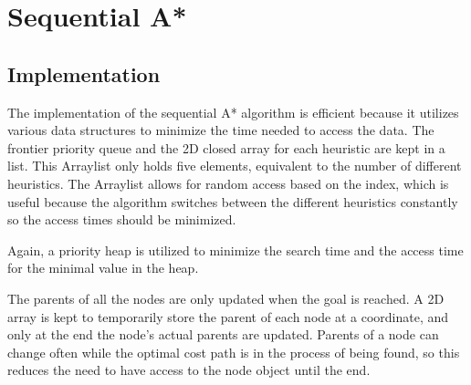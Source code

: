\section{Sequential A*}

\subsection{Implementation}

The implementation of the sequential A* algorithm is efficient because it utilizes various data structures to minimize the time needed to access the data. The frontier priority queue and the 2D closed array for each heuristic are kept in a list. This Arraylist only holds five elements, equivalent to the number of different heuristics. The Arraylist allows for random access based on the index, which is useful because the algorithm switches between the different heuristics constantly so the access times should be minimized.

Again, a priority heap is utilized to minimize the search time and the access time for the minimal value in the heap.

The parents of all the nodes are only updated when the goal is reached. A 2D array is kept to temporarily store the parent of each node at a coordinate, and only at the end the node's actual parents are updated. Parents of a node can change often while the optimal cost path is in the process of being found, so this reduces the need to have access to the node object until the end.